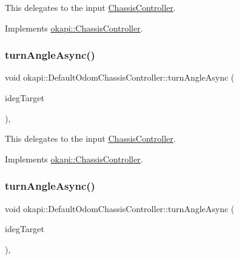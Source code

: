 This delegates to the input \mbox{\hyperlink{classokapi_1_1ChassisController}{Chassis\+Controller}}. 

Implements \mbox{\hyperlink{classokapi_1_1ChassisController_a6aca227e35ececd02eed1cc42d09ad1d}{okapi\+::\+Chassis\+Controller}}.

\mbox{\label{classokapi_1_1DefaultOdomChassisController_a18d748097a7938e3102638d17be54c76}} 
\subsubsection{\texorpdfstring{turnAngleAsync()}{turnAngleAsync()}\hspace{0.1cm}{\footnotesize\ttfamily [1/2]}}
{\footnotesize\ttfamily void okapi\+::\+Default\+Odom\+Chassis\+Controller\+::turn\+Angle\+Async (\begin{DoxyParamCaption}\item[{Q\+Angle}]{ideg\+Target }\end{DoxyParamCaption})\hspace{0.3cm}{\ttfamily [override]}, {\ttfamily [virtual]}}

This delegates to the input \mbox{\hyperlink{classokapi_1_1ChassisController}{Chassis\+Controller}}. 

Implements \mbox{\hyperlink{classokapi_1_1ChassisController_a87fc1f88bf06340d8f022a8c185b5e87}{okapi\+::\+Chassis\+Controller}}.

\mbox{\label{classokapi_1_1DefaultOdomChassisController_a948978204fc6f2a2443025dfdb0241b1}} 
\subsubsection{\texorpdfstring{turnAngleAsync()}{turnAngleAsync()}\hspace{0.1cm}{\footnotesize\ttfamily [2/2]}}
{\footnotesize\ttfamily void okapi\+::\+Default\+Odom\+Chassis\+Controller\+::turn\+Angle\+Async (\begin{DoxyParamCaption}\item[{double}]{ideg\+Target }\end{DoxyParamCaption})\hspace{0.3cm}{\ttfamily [override]}, {\ttfamily [virtual]}}

